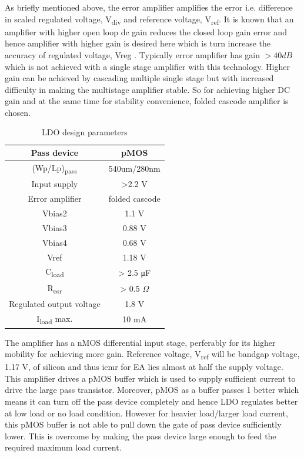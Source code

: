 \documentclass[12pt,a4paper,UKenglish]{report}
\begin{document}
As briefly mentioned above, the error amplifier amplifies the error i.e. difference in scaled regulated voltage, 
V\textsubscript{div} and reference voltage, V\textsubscript{ref}. It is known that an amplifier with higher 
open loop \acrshort{dc} gain reduces the closed loop gain error and hence amplifier with higher gain is desired 
here which is turn increase the accuracy of regulated voltage, Vreg \cite{ldo_bulkmod}. Typically error amplifier 
has gain $> 40 dB$ which is not achieved with a single stage amplifier with this technology. Higher gain can be 
achieved by cascading multiple single stage but with increased difficulty in making the multistage
amplifier stable. So for achieving higher DC gain and at the same time for stability convenience, folded cascode 
amplifier \cite[pp. xx]{razavi_2001} is chosen. \\

\begin{table}[H]
\caption{LDO design parameters}
\begin{center}
\begin{tabular}{c|c}
\hline \hline
Pass device				& pMOS \\ \hline
(Wp/Lp)\textsubscript{pass} 	& 540um/280nm \\ \hline
Input supply 				& >2.2 V \\ \hline
Error amplifier				& folded cascode \\ \hline
Vbias2 					& 1.1 V \\ \hline
Vbias3					& 0.88 V \\ \hline
Vbias4					& 0.68 V \\ \hline
Vref						& 1.18 V \\ \hline
C\textsubscript{load} 		& > 2.5 \si{\micro\farad}  \\ \hline
R\textsubscript{esr} 	 		& > 0.5 $\Omega$ \\ \hline
Regulated output voltage 		& 1.8 V \\ \hline
I\textsubscript{load} max. 		& 10 mA \\
\hline \hline
\end{tabular}
\end{center}
\label{tab:ldo_parameter}
\end{table}

The amplifier has a nMOS differential input stage, perferably for its higher mobility for achieving more gain.
Reference voltage, V\textsubscript{ref} will be bandgap voltage, 1.17 V, of silicon and  thus \acrshort{icmr} 
for EA lies almost at half the supply voltage. This amplifier drives a pMOS buffer which is used to supply 
sufficient current to drive the large pass transistor. Moreover, pMOS as a buffer passes 1 better which means 
it can turn off the pass device completely and hence LDO regulates better at low load or no load condition. 
However for heavier load/larger load current, this pMOS buffer is not able to pull down the gate of pass device 
sufficiently lower. This is overcome by making the pass device large enough to feed the required  maximum 
load current.\\
\end{document}
